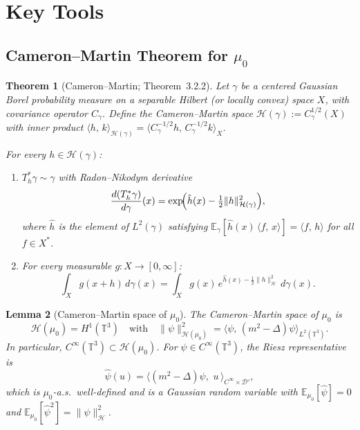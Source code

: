 \documentclass[11pt,a4paper]{article}
\theoremstyle{plain}
\newtheorem{theorem}{Theorem}[section]
\newtheorem{lemma}[theorem]{Lemma}
\theoremstyle{definition}
\newcommand{\T}{\mathbb{T}}
\newcommand{\cD}{\mathcal{D}}
\newcommand{\cH}{\mathcal{H}}
\newcommand{\E}{\mathbb{E}}
\newcommand{\ip}[2]{\langle #1,\,#2\rangle}
\newcommand{\norm}[1]{\|#1\|}
\begin{document}
\section{Key Tools}

\subsection{Cameron--Martin Theorem for $\mu_0$}\label{sec:CM}

\begin{theorem}[Cameron--Martin; \cite{Bog98} Theorem~3.2.2]\label{thm:CM}
Let $\gamma$ be a centered Gaussian Borel probability measure on a separable Hilbert (or
locally convex) space $X$, with covariance operator $C_\gamma$.
Define the \emph{Cameron--Martin space}
$\cH(\gamma) := C_\gamma^{1/2}(X)$
with inner product $\ip{h}{k}_{\cH(\gamma)} = \ip{C_\gamma^{-1/2}h}{C_\gamma^{-1/2}k}_{X}$.

For every $h \in \cH(\gamma)$:
\begin{enumerate}
\item[\textup{(a)}] $T_h^*\gamma \sim \gamma$ with Radon--Nikodym derivative
\begin{equation}\label{eq:CM-RN}
  \frac{d(T_h^*\gamma)}{d\gamma}(x)
  = \exp\!\Bigl(\hat{h}(x) - \tfrac{1}{2}\norm{h}_{\cH(\gamma)}^2\Bigr),
\end{equation}
where $\hat{h}$ is the element of $L^2(\gamma)$ satisfying
$\E_\gamma[\hat{h}(x)\,\ip{f}{x}] = \ip{f}{h}$ for all $f\in X^*$.

\item[\textup{(b)}] For every measurable $g:X\to[0,\infty]$:
\begin{equation}\label{eq:CM-sub}
  \int_X g(x + h)\,d\gamma(x)
  = \int_X g(x)\,e^{\hat{h}(x) - \frac{1}{2}\norm{h}_\cH^2}\,d\gamma(x).
\end{equation}
\end{enumerate}
\end{theorem}

\begin{lemma}[Cameron--Martin space of $\mu_0$]\label{lem:CM-space}
The Cameron--Martin space of $\mu_0$ is
\[
  \cH(\mu_0) = H^1(\T^3)
  \quad\text{with}\quad
  \norm{\psi}_{\cH(\mu_0)}^2 = \ip{\psi}{(m^2-\Delta)\psi}_{L^2(\T^3)}.
\]
In particular, $C^\infty(\T^3)\subset\cH(\mu_0)$.  For $\psi\in C^\infty(\T^3)$,
the Riesz representative is
\[
  \hat{\psi}(u) = \ip{(m^2-\Delta)\psi}{\,u\,}_{C^\infty\times\cD'},
\]
which is $\mu_0$-a.s.\ well-defined and is a Gaussian random variable with
$\E_{\mu_0}[\hat{\psi}] = 0$ and $\E_{\mu_0}[\hat{\psi}^2] = \norm{\psi}_{\cH}^2$.
\end{lemma}
\end{document}
